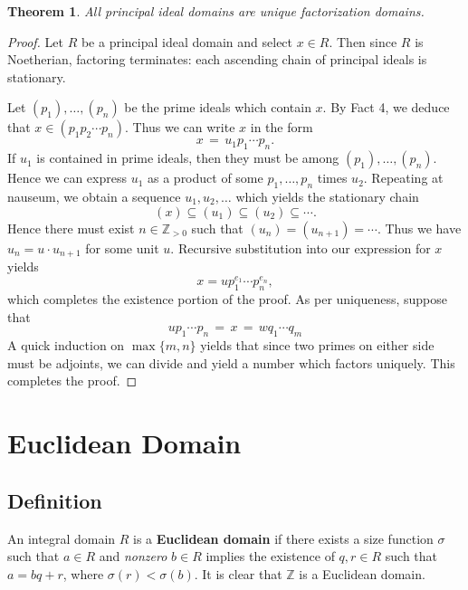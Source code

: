 \documentclass[11pt]{article}
\newtheorem{theorem}{Theorem}
\begin{document}
\begin{adjustwidth}{0.5cm}{}
  \begin{theorem}
    All principal ideal domains are unique factorization domains.
  \end{theorem}
  \begin{proof}
    Let $R$ be a principal ideal domain and select $x \in R$. Then since $R$ is Noetherian, factoring terminates: each ascending chain of principal ideals is stationary.

    Let $(p_{1}), \ldots, (p_{n})$ be the prime ideals which contain $x$. By Fact 4, we deduce that $x \in (p_{1}p_{2} \cdots p_{n})$. Thus we can write $x$ in the form
    \[
      x \, = \, u_{1} p_{1} \cdots p_{n}.
    \]
    If $u_{1}$ is contained in prime ideals, then they must be among $(p_{1}), \ldots, (p_{n})$. Hence we can express $u_{1}$ as a product of some $p_{1}, \ldots, p_{n}$ times $u_{2}$. Repeating at nauseum, we obtain a sequence $u_{1}, u_{2}, \ldots$ which yields the stationary chain
    \[
      (x) \subseteq (u_{1}) \subseteq (u_{2}) \subseteq \cdots.
    \]
    Hence there must exist $n \in \mathbb{Z}_{> 0}$ such that $(u_{n}) = (u_{n + 1}) = \cdots$. Thus we have $u_{n} = u \cdot u_{n + 1}$ for some unit $u$. Recursive substitution into our expression for $x$ yields
    \[
      x = u p_{1}^{e_{1}} \cdots p_{n}^{e_{n}},
    \]
    which completes the existence portion of the proof. As per uniqueness, suppose that
    \[
      u p_{1} \cdots p_{n} \, = \, x \, = \, w q_{1} \cdots q_{m}
    \]
    A quick induction on $\max \{ m, n \}$ yields that since two primes on either side must be adjoints, we can divide and yield a number which factors uniquely. This completes the proof.
  \end{proof}
\end{adjustwidth}


\section{Euclidean Domain}


\subsection{Definition}

An integral domain $R$ is a  \textbf{Euclidean domain} if there exists a size function $\sigma$ such that $a \in R$ and \textit{nonzero} $b \in R$ implies the existence of $q, r \in R$ such that $a = bq + r$, where $\sigma(r) < \sigma(b)$. It is clear that $\mathbb{Z}$ is a Euclidean domain.
\end{document}
